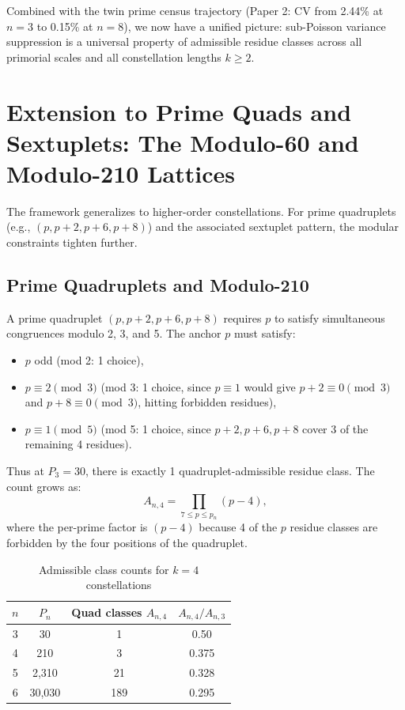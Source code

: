\documentclass[11pt]{article}
\begin{document}
Combined with the twin prime census trajectory (Paper 2: CV from 2.44\% at $n=3$ to 0.15\% at $n=8$), we now have a unified picture: sub-Poisson variance suppression is a universal property of admissible residue classes across all primorial scales and all constellation lengths $k \geq 2$.

\section{Extension to Prime Quads and Sextuplets: The Modulo-60 and Modulo-210 Lattices}

The framework generalizes to higher-order constellations. For prime quadruplets (e.g., $(p, p+2, p+6, p+8)$) and the associated sextuplet pattern, the modular constraints tighten further.

\subsection{Prime Quadruplets and Modulo-210}

A prime quadruplet $(p, p+2, p+6, p+8)$ requires $p$ to satisfy simultaneous congruences modulo 2, 3, and 5. The anchor $p$ must satisfy:
\begin{itemize}
  \item $p$ odd (mod 2: 1 choice),
  \item $p \equiv 2 \pmod 3$ (mod 3: 1 choice, since $p \equiv 1$ would give $p+2 \equiv 0 \pmod 3$ and $p+8 \equiv 0 \pmod 3$, hitting forbidden residues),
  \item $p \equiv 1 \pmod 5$ (mod 5: 1 choice, since $p+2, p+6, p+8$ cover 3 of the remaining 4 residues).
\end{itemize}
Thus at $P_3 = 30$, there is exactly 1 quadruplet-admissible residue class. The count grows as:
\begin{equation}
    A_{n,4} = \prod_{7 \le p \le p_n} (p-4),
\end{equation}
where the per-prime factor is $(p-4)$ because 4 of the $p$ residue classes are forbidden by the four positions of the quadruplet.

\begin{table}[h]
\centering
\caption{Admissible class counts for $k=4$ constellations}
\label{tab:quad_counts}
\begin{tabular}{cccc}
\toprule
$n$ & $P_n$ & Quad classes $A_{n,4}$ & $A_{n,4}/A_{n,3}$ \\
\midrule
3 & 30 & 1 & 0.50 \\
4 & 210 & 3 & 0.375 \\
5 & 2{,}310 & 21 & 0.328 \\
6 & 30{,}030 & 189 & 0.295 \\
\bottomrule
\end{tabular}
\end{table}
\end{document}
